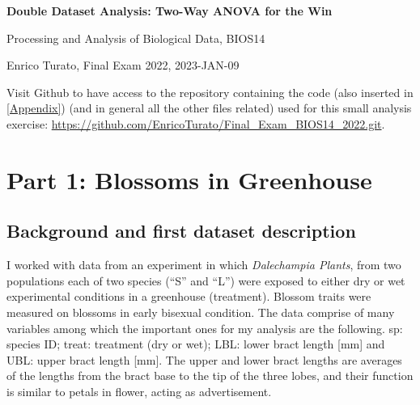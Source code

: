 \documentclass{article}
\begin{document}
        \Large
        \begin{center}
        \textbf{Double Dataset Analysis: Two-Way ANOVA for the Win}
               
        \Large
        Processing and Analysis of Biological Data, BIOS14
        
        \large
        Enrico Turato, Final Exam 2022, 2023-JAN-09
        \end{center} 

Visit Github to have access to the repository containing the code (also inserted in \autoref{Appendix}) (and in general all the other files related) used for this small analysis exercise: \url{https://github.com/EnricoTurato/Final_Exam_BIOS14_2022.git}.
%
\section{Part 1: Blossoms in Greenhouse}

\subsection{Background and first dataset description}

I worked with data from an experiment in which \emph{Dalechampia Plants}, from two populations each of two species (“S” and “L”) were exposed to either dry or wet experimental conditions in a greenhouse (treatment). Blossom traits were measured on blossoms in early bisexual condition. The data comprise of many variables among which the important ones for my analysis are the following.
sp: species ID; treat: treatment (dry or wet); LBL: lower bract length [mm] and  UBL: upper bract length [mm]. The upper and lower bract lengths are averages of the lengths from the bract base to the tip of the three lobes, and their function is similar to petals in flower, acting as advertisement.
\end{document}
